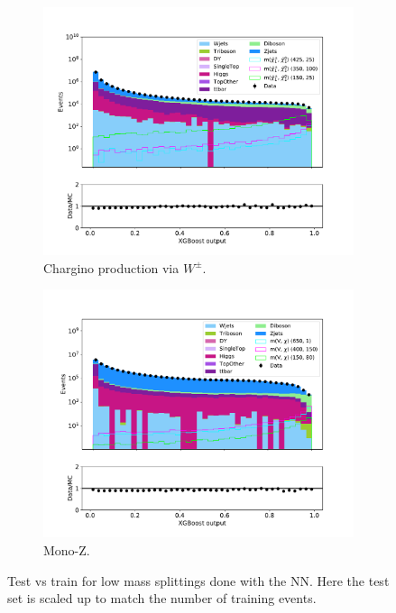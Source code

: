 \begin{figure}[H]
\begin{subfigure}[t!]{0.49\textwidth}
        \label{fig:SlepsnuNNLow}
    \end{subfigure}      
    \begin{subfigure}[t!]{0.49\textwidth}
        \includegraphics[width = \textwidth]{Figures/Stacked/stackedplot_BDT_All_level_WW.pdf}
        \caption{Chargino production via $W^\pm$.}
        \label{fig:WWNNLow}
    \end{subfigure}
    \begin{subfigure}[t!]{0.49\textwidth}
        \includegraphics[width = \textwidth]{Figures/Stacked/stackedplot_BDT_All_level_monoZ.pdf}
        \caption{Mono-Z.}
        \label{fig:MonoZNNLow}
    \end{subfigure}
    \caption{Test vs train for low mass splittings done with the NN. Here the test set is scaled up to match the number of training events.}
    \label{fig:AllLowNN}
\end{figure}


